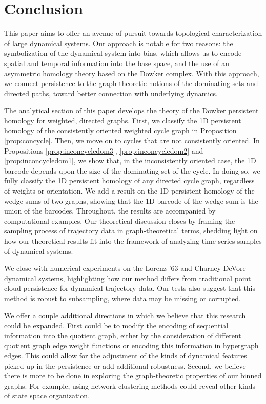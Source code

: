 \documentclass[pdflatex,bst/sn-mathphys-num]{sn-jnl}%
\theoremstyle{thmstyleone}%
\theoremstyle{definition}
\theoremstyle{thmstyletwo}%
\theoremstyle{thmstylethree}%
\begin{document}
\section{Conclusion}

This paper aims to offer an avenue of pursuit towards topological characterization of large dynamical systems. Our approach is notable for two reasons: the symbolization of the dynamical system into bins, which allows us to encode spatial and temporal information into the base space, and the use of an asymmetric homology theory based on the Dowker complex. With this approach, we connect persistence to the graph theoretic notions of the dominating sets and directed paths, toward better connection with underlying dynamics.



The analytical section of this paper develops the theory of the Dowker persistent homology for weighted, directed graphs. First, we classify the 1D persistent homology of the consistently oriented weighted cycle graph in Proposition \ref{prop:concycle}. Then, we move on to cycles that are not consistently oriented. In Propositions \ref{prop:inconcycledom3}, \ref{prop:inconcycledom2} and \ref{prop:inconcycledom1}, we show that, in the inconsistently oriented case, the 1D barcode depends upon the size of the dominating set of the cycle. In doing so, we fully classify the 1D persistent homology of any directed cycle graph, regardless of weights or orientation. We add a result on the 1D persistent homology of the wedge sums of two graphs, showing that the 1D barcode of the wedge sum is the union of the barcodes. Throughout, the results are accompanied by computational examples. Our theoretical discussion closes by framing the sampling process of trajectory data in graph-theoretical terms, shedding light on how our theoretical results fit into the framework of analyzing time series samples of dynamical systems. 

We close with numerical experiments on the Lorenz '63 and Charney-DeVore dynamical systems, highlighting how our method differs from traditional point cloud persistence for dynamical trajectory data. Our tests also suggest that this method is robust to subsampling, where data may be missing or corrupted.

We offer a couple additional directions in which we believe that this research could be expanded. First could be to modify the encoding of sequential information into the quotient graph, either by the consideration of different quotient graph edge weight functions or encoding this information in hypergraph edges. This could allow for the adjustment of the kinds of dynamical features picked up in the persistence or add additional robustness. Second, we believe there is more to be done in exploring the graph-theoretic properties of our binned graphs. For example, using network clustering methods could reveal other kinds of state space organization.
\end{document}
